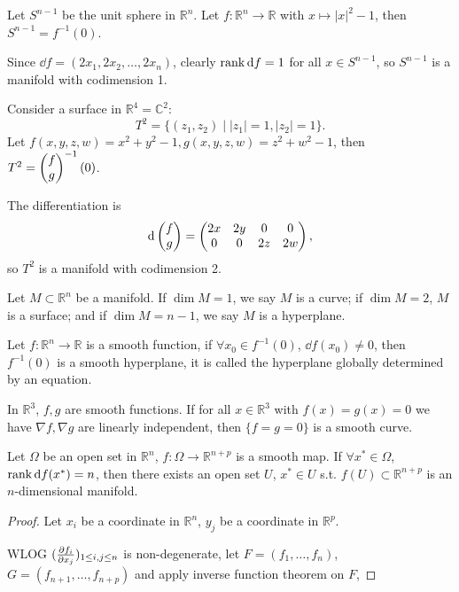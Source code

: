 \begin{example}
    Let $S^{n-1}$ be the unit sphere in $\mathbb{R}^{n}$.
	Let $f: \mathbb{R}^{n}\to \mathbb{R}$ with $x\mapsto |x|^2 - 1$,
	then $S^{n-1} = f^{-1}(0)$.

	Since $\dd f = (2x_1, 2x_2, \dots, 2x_n)$, clearly $\operatorname{rank} \mathop{}\!\mathrm{d} f = 1$ for
	all $x\in S^{n-1}$, so $S^{n-1}$ is a manifold with codimension 1.
\end{example}
\begin{example}
    Consider a surface in $\mathbb{R}^{4} = \mathbb{C}^2$:
	\[
	T^2 = \{(z_1, z_2)\mid |z_1| = 1, |z_2| = 1\}.
	\]
	Let $f(x,y,z,w) = x^2+y^2-1, g(x,y,z,w) = z^2+w^2-1$,
	then $T^2 = \begin{pmatrix} f\\g \end{pmatrix}^{-1}(0)$.

	The differentiation is
	\[
	\mathop{}\!\mathrm{d} \begin{pmatrix} f\\g \end{pmatrix} = \begin{pmatrix}
		2x &2y &0 &0 \\ 0 &0 &2z &2w
	\end{pmatrix},
	\]
	so $T^2$ is a manifold with codimension 2.
\end{example}

\begin{definition}
	Let $M \subset \mathbb{R}^{n}$ be a manifold. If $\dim M = 1$,
	we say $M$ is a curve; if $\dim M = 2$, $M$ is a surface;
	and if $\dim M = n-1$, we say $M$ is a hyperplane.
\end{definition}

\begin{lemma}
	Let $f: \mathbb{R}^{n}\to \mathbb{R}$ is a smooth function,
	if $\forall x_0\in f^{-1}(0)$, $\dd f(x_0)\ne 0$,
	then $f^{-1}(0)$ is a smooth hyperplane, it is called the
	hyperplane globally determined by an equation.
\end{lemma}
\begin{example}
    In $\mathbb{R}^{3}$, $f,g$ are smooth functions.
	If for all $x\in \mathbb{R}^{3}$ with $f(x) = g(x) = 0$ we have
	$\nabla f, \nabla g$ are linearly independent,
	then $\{f = g = 0\}$ is a smooth curve.
\end{example}

\begin{theorem}
    Let $\Omega$ be an open set in $ \mathbb{R}^{n}$,
	$f: \Omega\to \mathbb{R}^{n+p}$ is a smooth map.
	If $\forall x^*\in \Omega$, $\operatorname{rank} \mathop{}\!\mathrm{d} f(x^*) = n$,
	then there exists an open set $U$, $x^*\in U$ s.t.
	$f(U) \subset \mathbb{R}^{n+p}$ is an $n$-dimensional manifold.
\end{theorem}
\begin{proof}[Proof]
    Let $x_i$ be a coordinate in $\mathbb{R}^{n}$, $y_j$ be
	a coordinate in $\mathbb{R}^{p}$.

	WLOG $(\frac{\partial f_i}{\partial x_j})_{1\le i,j\le n}$ is non-degenerate,
	let $F = (f_1,\dots, f_n)$, $G = (f_{n+1},\dots, f_{n+p})$ 
	and apply inverse function theorem on $F$,
\end{proof}
